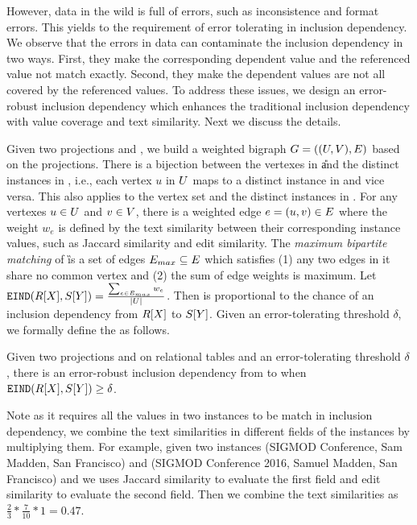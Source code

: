 However, data in the wild is full of errors, such as inconsistence and format errors. This yields to the requirement of error tolerating in inclusion dependency. We observe that the errors in data can contaminate the inclusion dependency in two ways. First, they make the corresponding dependent value and the referenced value not match exactly. Second, they make the dependent values are not all covered by the referenced values. To address these issues, we design an error-robust inclusion dependency which enhances the traditional inclusion dependency with value coverage and text similarity. Next we discuss the details.


Given two projections \RX and \SY, we build a weighted bigraph $G=((U,V),E)$ based on the projections. There is a bijection between the vertexes in \U and the distinct instances in \RX, i.e., each vertex $u$ in $U$ maps to a distinct instance in \RX and vice versa. This also applies to the vertex set \V and the distinct instances in \SY. For any vertexes $u\in U$ and $v\in V$, there is a weighted edge $e=(u,v)\in E$ where the weight $w_e$ is defined by the text similarity between their corresponding instance values, such as Jaccard similarity and edit similarity. The \emph{maximum bipartite matching} of \G is a set of edges $E_{max}\subseteq E$ which satisfies (1) any two edges in it share no common vertex and (2) the sum of edge weights is maximum. Let $\texttt{EIND}(R[X],S[Y])=\frac{\sum_{e\in E_{max}}w_e}{|U|}$. Then \EIND is proportional to the chance of an inclusion dependency from $R[X]$ to $S[Y]$. Given an error-tolerating threshold $\delta$, we formally define the \eind as follows.

\begin{definition}
Given two projections \RX and \SY on relational tables and an error-tolerating threshold $\delta$, there is an error-robust inclusion dependency from \X to \Y when $\texttt{EIND}(R[X],S[Y])\geq\delta$.
\end{definition}


Note as it requires all the values in two instances to be match in inclusion dependency, we combine the text  similarities in different fields of the instances by multiplying them. For example, given two instances \textsf{(SIGMOD Conference, Sam Madden, San Francisco)} and \textsf{(SIGMOD Conference 2016, Samuel Madden, San Francisco)} and we uses Jaccard similarity to evaluate the first field and edit similarity to evaluate the second field. Then we combine the text similarities as $\frac{2}{3}*\frac{7}{10}*1=0.47$.

